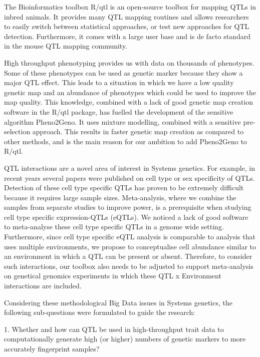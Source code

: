 The Bioinformatics toolbox R/qtl \cite{Broman:2003, Arends:2010} is an open-source toolbox for mapping QTLs in inbred 
animals. It provides many QTL mapping routines and allows researchers to easily switch between statistical approaches, 
or test new approaches for QTL detection. Furthermore, it comes with a large user base and is de facto standard in 
the mouse QTL mapping community.

High throughput phenotyping provides us with data on thousands of phenotypes. Some of these phenotypes can be used 
as genetic marker because they show a major QTL effect. This leads to a situation in which we have a low quality genetic 
map and an abundance of phenotypes which could be used to improve the map quality. This knowledge, combined with a 
lack of good genetic map creation software in the R/qtl package, has fuelled the development of the sensitive algorithm 
Pheno2Geno. It uses mixture modelling, combined with a sensitive pre-selection approach. This results in faster 
genetic map creation as compared to other methods, and is the main reason for our ambition to add Pheno2Geno to R/qtl. 

QTL interactions are a novel area of interest in Systems genetics. For example, in recent years several papers were 
published on cell type or sex specificity of QTLs. Detection of these cell type specific QTLs has proven to be extremely 
difficult because it requires large sample sizes.  Meta-analysis, where we combine the samples from separate studies 
to improve power, is a prerequisite when studying cell type specific expression-QTLs (eQTLs). We noticed a lack of 
good software to meta-analyse these cell type specific QTLs in a genome wide setting. Furthermore, since cell type specific 
eQTL analysis is comparable to analysis that uses multiple environments, we propose to conceptualise cell abundance 
similar to an environment in which a QTL can be present or absent. Therefore, to consider such interactions, our toolbox 
also needs to be adjusted to support meta-analysis on genetical genomics experiments in which these QTL x Environment 
interactions are included.

Considering these methodological Big Data issues in Systems genetics, the following sub-questions were formulated to 
guide the research: 

1. Whether and how can QTL be used in high-throughput trait data to computationally generate high (or higher) numbers of genetic markers to more accurately fingerprint samples? 

